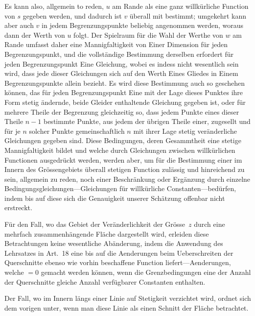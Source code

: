 \documentclass[a4paper,12pt]{article}
\begin{document}
Es kann also, allgemein to reden, $u$ am Rande als eine ganz
willk\"{u}rliche Function von $s$ gegeben werden, und dadurch ist
$v$ \"{u}berall mit bestimmt; umgekehrt kann aber auch $v$ in
jedem Begrenzungspunkte beliebig angenommen werden, woraus dann
der Werth von $u$ folgt.  Der Spielraum f\"{u}r die Wahl der
Werthe von $w$ am Rande umfasst daher eine Mannigfaltigkeit von
Einer Dimension f\"{u}r jeden Begrenzungspunkt, und die
vollst\"{a}ndige Bestimmung derselben erfordert f\"{u}r jeden
Begrenzungspunkt Eine Gleichung, wobei es indess nicht wesentlich
sein wird, dass jede dieser Gleichungen sich auf den Werth Eines
Gliedes in Einem Begrenzungspunkte allein bezieht.  Es wird diese
Bestimmung auch so geschehen k\"{o}nnen, das f\"{u}r jeden
Begrenzungspunkt Eine mit der Lage dieses Punktes ihre Form
stetig \"{a}ndernde, beide Gleider enthaltende Gleichung gegeben
ist, oder f\"{u}r mehrere Theile der Begrenzung gleichzeitig so,
dass jedem Punkte eines dieser Theile $n - 1$ bestimmte Punkte,
aus jedem der \"{u}brigen Theile einer, zugesellt und f\"{u}r je
$n$ solcher Punkte gemeinschaftlich $n$ mit ihrer Lage stetig
ver\"{a}nderliche Gleichungen gegeben sind.  Diese Bedingungen,
deren Gesammtheit eine stetige Mannigfaltigkeit bildet und welche
durch Gleichungen zwischen willk\"{u}rlichen Functionen
ausgedr\"{u}ckt werden, werden aber, um f\"{u}r die Bestimmung
einer im Innern des Gr\"{o}ssengebiets \"{u}berall stetigen
Function zul\"{a}ssig und hinreichend zu sein, allgemein zu
reden, noch einer Beschr\"{a}nkung oder Erg\"{a}nzung durch
einzelne Bedingungsgleichungen---Gleichungen f\"{u}r
willk\"{u}rliche Constanten---bed\"{u}rfen, indem bis auf diese
sich die Genauigkeit unserer Sch\"{a}tzung offenbar nicht
erstreckt.

F\"{u}r den Fall, wo das Gebiet der Ver\"{a}nderlichkeit der
Gr\"{o}sse~$z$ durch eine mehrfach zusammenh\"{a}ngende
Fl\"{a}che dargestellt wird, erleiden diese Betrachtungen keine
wesentliche Ab\"{a}nderung, indem die Anwendung des Lehrsatzes in
Art.~18 eine bis auf die Aenderungen beim Ueberschreiten der
Querschnitte ebenso wie vorhin beschaffene Function
liefert---Aenderungen, welche $= 0$ gemacht werden k\"{o}nnen,
wenn die Grenzbedingungen eine der Anzahl der Querschnitte
gleiche Anzahl verf\"{u}gbarer Constanten enthalten.

Der Fall, wo im Innern l\"{a}ngs einer Linie auf Stetigkeit
verzichtet wird, ordnet sich dem vorigen unter, wenn man diese
Linie als einen Schnitt der Fl\"{a}che betrachtet.
\end{document}
